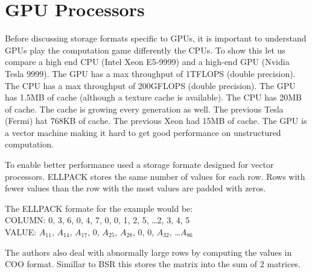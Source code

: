 \section{GPU Processors}
Before discussing storage formats specific to GPUs, it is important to understand GPUs play the computation game differently the CPUs. To show this let us compare a high end CPU (Intel Xeon E5-9999) and a high-end GPU (Nvidia Tesla 9999). The GPU has a max throughput of 1TFLOPS (double precision). The CPU has a max throughput of 200GFLOPS (double precision). The GPU has 1.5MB of cache (although a texture cache is available). The CPU has 20MB of cache. The cache is growing every generation as well. The previous Tesla (Fermi) hat 768KB of cache. The previous Xeon had 15MB of cache. The GPU is a vector machine making it hard to get good performance on unstructured computation.
\par To enable better performance \cite{} used a storage formate designed for vector processors. ELLPACK stores the same number of values for each row. Rows with fewer values than the row with the most values are padded with zeros.\\
\par The ELLPACK formate for the example would be:\\
COLUMN: 0, 3, 6, 0, 4, 7, 0, 0, 1, 2, 5, \dots 2, 3, 4, 5\\ \normalsize
VALUE: $A_{11}$, $A_{14}$, $A_{17}$, $0$, $A_{25}$, $A_{28}$, $0$, $0$, $A_{32}$, \dots $A_{86}$\\ \normalsize
\par The authors also deal with abnormally large rows by computing the values in COO format. Simillar to BSR this stores the matrix into the sum of 2 matrices.
